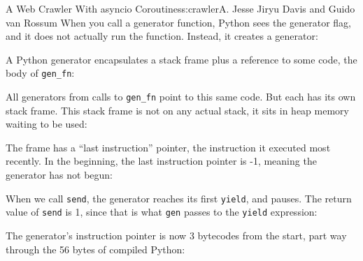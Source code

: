 \begin{aosachapter}{A Web Crawler With asyncio Coroutines}{s:crawler}{A. Jesse Jiryu Davis and Guido van Rossum}
When you call a generator function, Python sees the generator flag, and
it does not actually run the function. Instead, it creates a generator:

\begin{Shaded}
\begin{Highlighting}[]
\NormalTok{>>> }
\NormalTok{<} \NormalTok{>}
\end{Highlighting}
\end{Shaded}

A Python generator encapsulates a stack frame plus a reference to some
code, the body of \texttt{gen\_fn}:

\begin{Shaded}
\begin{Highlighting}[]
\end{Highlighting}
\end{Shaded}

All generators from calls to \texttt{gen\_fn} point to this same code.
But each has its own stack frame. This stack frame is not on any actual
stack, it sits in heap memory waiting to be used:


The frame has a ``last instruction'' pointer, the instruction it
executed most recently. In the beginning, the last instruction pointer
is -1, meaning the generator has not begun:

\begin{Shaded}
\begin{Highlighting}[]
\NormalTok{-}
\end{Highlighting}
\end{Shaded}

When we call \texttt{send}, the generator reaches its first
\texttt{yield}, and pauses. The return value of \texttt{send} is 1,
since that is what \texttt{gen} passes to the \texttt{yield} expression:

\begin{Shaded}
\begin{Highlighting}[]
\NormalTok{)}
\end{Highlighting}
\end{Shaded}

The generator's instruction pointer is now 3 bytecodes from the start,
part way through the 56 bytes of compiled Python:


\end{aosachapter}
